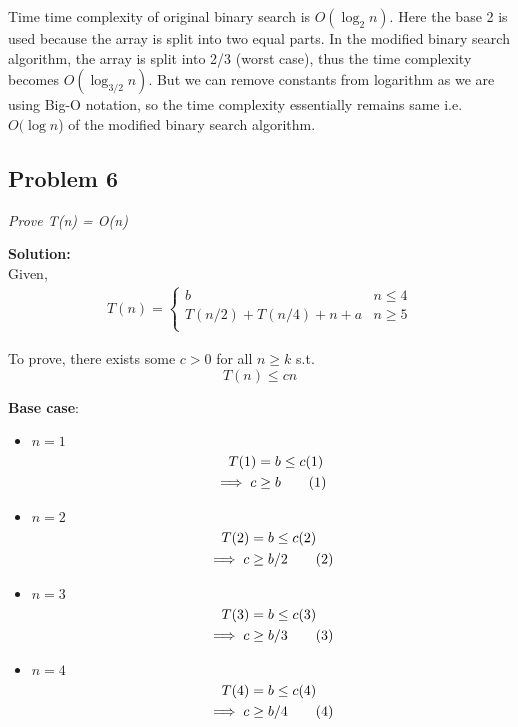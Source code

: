 \documentclass[12pt,a4paper]{article}
\newcommand\numberthis{\addtocounter{equation}{1}\tag{\theequation}}
\newcommand{\solution}{\noindent\textbf{Solution:}\\}
\begin{document}
Time time complexity of original binary search is $O(\log_{2} n)$. Here the base 2 is used because the array is split into two equal parts. In the modified binary search algorithm, the array is split into 2/3 (worst case), thus the time complexity becomes $O(\log_{3/2} n)$. But we can remove constants from logarithm as we are using Big-O notation, so the time complexity essentially remains same i.e. $O(\log n$) of the modified binary search algorithm.

\newpage
\subsection*{Problem 6}
\textit{
    Prove T(n) = O(n)
}

\solution

Given,
\begin{align*}
    T(n) = 
    \begin{cases}
    b & n \leq 4\\
    T(n/2) + T(n/4) + n + a & n \geq 5\\
    \end{cases}
\end{align*}

To prove, there exists some $c > 0$ for all $n \geq k$ s.t.
\begin{equation*}
    T(n) \leq cn
\end{equation*}

\textbf{Base case}:

\begin{itemize}
    \item $n=1$
    \begin{align*}
        T(1) &= b \leq c(1) \\
        \implies c &\geq b \numberthis \label{eq:q_6_1}
    \end{align*}
    \item $n=2$
    \begin{align*}
        T(2) &= b \leq c(2) \\
        \implies c &\geq b/2 \numberthis \label{eq:q_6_2}
    \end{align*}
    \item $n=3$
    \begin{align*}
        T(3) &= b \leq c(3) \\
        \implies c &\geq b/3 \numberthis \label{eq:q_6_3}
    \end{align*}
    \item $n=4$
    \begin{align*}
        T(4) &= b \leq c(4) \\
        \implies c &\geq b/4 \numberthis \label{eq:q_6_4}
    \end{align*}
\end{itemize}
\end{document}
